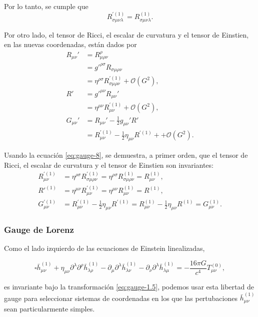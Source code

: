 \documentclass[letterpaper,11pt]{article}
\begin{document}
Por lo tanto, se cumple que
\begin{equation}
R_{\sigma\mu\nu\lambda}^{'(1)} = R_{\sigma\mu\nu\lambda}^{(1)}. \label{eq:gauge-8}
\end{equation}

Por otro lado, el tensor de Ricci, el escalar de curvatura y el tensor de Einstien, en las nuevas coordenadas, están dados por 
\begin{align}
R_{\mu\nu}' &= R^{\rho}_{\mu\rho\nu} \nonumber \\
&= g'^{\rho\sigma} R_{\sigma\mu\rho\nu} \nonumber \\
&= \eta^{\rho\sigma} R_{\sigma\mu\rho\nu}^{'(1)} + \mathcal{O}(G^2), \\
R' &= g'^{\mu\nu} R_{\mu\nu}'  \nonumber \\
&= \eta^{\mu\nu} R_{\mu\nu}^{'(1)} + \mathcal{O}(G^2), \\
G_{\mu\nu}' &= R_{\mu\nu} ' - \frac{1}{2} g_{\mu\nu} ' R'\nonumber\\
&= R_{\mu\nu}^{'(1)} - \frac{1}{2} \eta_{\mu\nu} R^{'(1)} + + \mathcal{O}(G^2).
\end{align}

Usando la ecuación \eqref{eq:gauge-8}, se demuestra, a primer orden, que el tensor de Ricci, el escalar de curvatura y el tensor de Einstien son invariantes:
\begin{align}
R_{\mu\nu}^{'(1)} &= \eta^{\rho\sigma} R_{\sigma\mu\rho\nu}^{'(1)} =  \eta^{\rho\sigma} R_{\sigma\mu\rho\nu}^{(1)} = R_{\mu\nu}^{(1)}, \\
R'^{(1)} &= \eta^{\mu\nu} R_{\mu\nu}^{'(1)} = \eta^{\mu\nu} R_{\mu\nu}^{(1)} = R^{(1)},   \\
G_{\mu\nu}^{'(1)} &= R_{\mu\nu}^{'(1)} - \frac{1}{2} \eta_{\mu\nu} R^{'(1)} = R_{\mu\nu}^{(1)} - \frac{1}{2} \eta_{\mu\nu} R^{(1)} = G_{\mu\nu}^{(1)}.
\end{align}

\subsubsection{Gauge de Lorenz}

Como el lado izquierdo de las ecuaciones de Einstein linealizadas,
\begin{shaded}
\begin{equation}
\square \bar{h}_{\mu\nu}^{(1)} + \eta_{\mu\nu} \partial^{\lambda}\partial^{\rho}\bar{h}_{\lambda\rho}^{(1)}- \partial_{\mu}\partial^{\lambda} \bar{h}_{\lambda \nu}^{(1)} - \partial_{\nu}\partial^{\lambda} \bar{h}_{\lambda\mu}^{(1)} = - \frac{16\pi G}{c^4} T_{\mu\nu}^{(0)}, \label{eq:Einstei-eq-first-order}
\end{equation}
\end{shaded}
es invariante bajo la transformación \eqref{eq:gauge-1.5}, podemos usar esta libertad de gauge para seleccionar sistemas de coordenadas en los que las pertubaciones $\bar{h}_{\mu\nu}^{(1)}$ sean particularmente simples.
\end{document}
